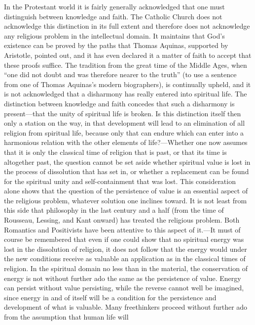 \documentclass[12pt,a4paper]{book}
\newcommand{\opage}[1]{\marginnote{\footnotesize\textit{[#1]}}}
\begin{document}
In the Protestant world it is fairly generally acknowledged that one must
distinguish between knowledge and faith. The Catholic Church does not
acknowledge this distinction in its full extent and therefore does not
acknowledge any religious problem in the intellectual domain. It
maintains that God's existence can be proved by the paths that Thomas
Aquinas, supported by Aristotle, pointed out, and it has even declared
it a matter of faith to accept that these proofs suffice. The tradition
from the great time of the Middle Ages, when ``one did not doubt and was
therefore nearer to the truth'' (to use a sentence from one of Thomas
Aquinas's modern biographers), is continually upheld, and it is not
acknowledged that a 
\opage{8}disharmony has really entered into spiritual life.
The distinction between knowledge and faith concedes that such a
disharmony is present---that the unity of spiritual life is broken. Is
this distinction itself then only a station on the way, in that
development will lead to an elimination of all religion from spiritual
life, because only that can endure which can enter into a harmonious
relation with the other elements of life?---Whether one now assumes that
it is only the classical time of religion that is past, or that its time
is altogether past, the question cannot be set aside whether spiritual
value is lost in the process of dissolution that has set in, or whether
a replacement can be found for the spiritual unity and self-containment
that was lost. This consideration alone shows that the question of the
persistence of value is an essential aspect of the religious problem,
whatever solution one inclines toward. It is not least from this side
that philosophy in the last century and a half (from the time of
Rousseau, Lessing, and Kant onward) has treated the religious problem.
Both Romantics and Positivists have been attentive to this aspect of
it.---It must of course be remembered that even if one could show that
no spiritual energy was lost in the dissolution of religion, it does not
follow that the energy would under the new conditions receive as
valuable an application as in the classical times of religion. In the
spiritual domain no less than in the material, the conservation of
energy is not without further ado the same as the persistence of value.
Energy can persist without value persisting, while the reverse cannot
well be imagined, since energy in and of itself will be a condition for
the persistence and development of what is valuable. Many freethinkers
proceed without further ado from the assumption that human life will
\end{document}
